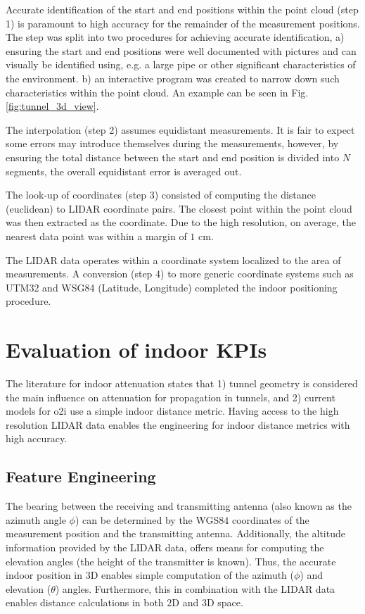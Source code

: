 Accurate identification of the start and end positions within the point cloud (step 1) is paramount to high accuracy for the remainder of the measurement positions. The step was split into two procedures for achieving accurate identification, a) ensuring the start and end positions were well documented with pictures and can visually be identified using, e.g. a large pipe or other significant characteristics of the environment. b) an interactive program was created to narrow down such characteristics within the point cloud. An example can be seen in Fig. \ref{fig:tunnel_3d_view}. 

The interpolation (step 2) assumes equidistant measurements. It is fair to expect some errors may introduce themselves during the measurements, however, by ensuring the total distance between the start and end position is divided into $N$ segments, the overall equidistant error is averaged out.

The look-up of coordinates (step 3) consisted of computing the distance (euclidean) to LIDAR coordinate pairs. The closest point within the point cloud was then extracted as the coordinate. Due to the high resolution, on average, the nearest data point was within a margin of $1$ cm.

The LIDAR data operates within a coordinate system localized to the area of measurements. A conversion (step 4)  to more generic coordinate systems such as UTM32 and WSG84 (Latitude, Longitude) \cite{alan_d_snow_2020_3714221} completed the indoor positioning procedure. 


\section{Evaluation of indoor KPIs}
The literature for indoor attenuation states that 1) tunnel geometry is considered the main influence on attenuation for propagation in tunnels, and 2) current models for \gls{o2i} use a simple indoor distance metric. Having access to the high resolution LIDAR data enables the engineering for indoor distance metrics with high accuracy. 


\subsection{Feature Engineering}
The bearing between the receiving and transmitting antenna (also known as the azimuth angle $\phi$) can be determined by the WGS$84$ coordinates of the measurement position and the transmitting antenna. Additionally, the altitude information provided by the LIDAR data, offers means for computing the elevation angles (the height of the transmitter is known). Thus, the accurate indoor position in $3$D enables simple computation of the azimuth ($\phi$) and elevation ($\theta$) angles. Furthermore, this in combination with the LIDAR data enables distance calculations in both $2$D and $3$D space. 

